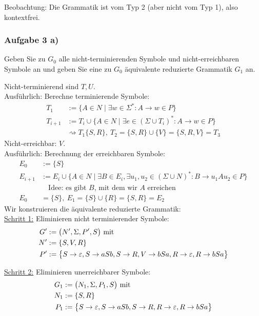 Beobachtung: Die Grammatik ist vom Typ 2 (aber nicht vom Typ 1), also kontextfrei.
	
\subsubsection{Aufgabe 3 a)}
Geben Sie zu $G_0$ alle nicht-terminierenden Symbole und nicht-erreichbaren Symbole an und geben Sie eine zu $G_0$ äquivalente reduzierte Grammatik $G_1$ an.

\begin{lösung}
	Nicht-terminierend sind $T,U$.\\
	Ausführlich: Berechne terminierende Symbole:
	\begin{align*}
		T_1&:=\big\lbrace A\in N\mid\exists w\in\Sigma^\ast:A\to w\in P\big\rbrace\\
		T_{i+1}&:=T_i\cup\big\lbrace A\in N\mid\exists e\in (\Sigma\cup T_i)^\ast:A\to w\in P\big\rbrace\\
		&\rightsquigarrow T_1\lbrace S,R\rbrace,~T_2=\lbrace S,R\rbrace\cup\lbrace V\rbrace=\lbrace S,R,V\rbrace=T_3
	\end{align*}
	Nicht-erreichbar: $V$.\\
	Ausführlich: Berechnung der erreichbaren Symbole:
	\begin{align*}
		E_0&:=\lbrace S\rbrace\\
		E_{i+1}&:=E_i\cup\big\lbrace A\in N\mid \exists B\in E_i,\exists u_1,u_2\in(\Sigma\cup N)^\ast:B\to u_1 Au_2\in P\big\rbrace\\
		&\quad\text{Idee: es gibt $B$, mit dem wir $A$ erreichen}\\
		E_0&=\lbrace S\rbrace,~E_1=\lbrace S\rbrace\cup\lbrace R\rbrace=\lbrace S,R\rbrace=E_2
	\end{align*}
	Wir konstruieren die äquivalente reduzierte Grammatik:\\
	\underline{Schritt 1:} Eliminieren nicht terminierender Symbole:
	\begin{align*}
		G'&:=\big(N',\Sigma,P',S\big)\mit\\
		N'&:=\lbrace S,V,R\rbrace\\
		P'&:=\big\lbrace
			S\to\varepsilon, S\to aSb,S\to R,V\to bSa,R\to\varepsilon,R\to bSa
		\big\rbrace
	\end{align*}
	
	\underline{Schritt 2:} Eliminieren unerreichbarer Symbole:
	\begin{align*}
		G_1&:=\big(N_1,\Sigma,P_1,S\big)\mit\\
		N_1&:=\lbrace S,R\rbrace\\
		P_1&:=\big\lbrace
			S\to\varepsilon, S\to aSb,S\to R,R\to\varepsilon,R\to bSa
		\big\rbrace
	\end{align*}
\end{lösung}

